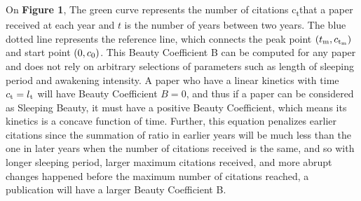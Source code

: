 \documentclass[utf8]{frontiersSCNS}
\begin{document}
On  \textbf{Figure 1}, The green curve represents the number of citations c\textsubscript{t}that a paper received at each year and $t$ is the number of years between two years. The blue dotted line represents the reference line, which connects the peak point $(t\textsubscript{m}, c\textsubscript{t\textsubscript{m}})$ and start point $(0, c\textsubscript{0})$. This Beauty Coefficient B can be computed for any paper and does not rely on arbitrary selections of parameters such as length of sleeping period and awakening intensity. A paper who have a linear kinetics with time $c\textsubscript{t} = l\textsubscript{t}$ will have Beauty Coefficient $B = 0$, and thus if a paper can be considered as Sleeping Beauty, it must have a positive Beauty Coefficient, which means its kinetics is a concave function of time. Further, this equation penalizes earlier citations since the summation of ratio in earlier years will be much less than the one in later years when the number of citations received is the same, and so with longer sleeping period, larger maximum citations received, and more abrupt changes happened before the maximum number of citations reached, a publication will have a larger Beauty Coefficient B. 
\end{document}
